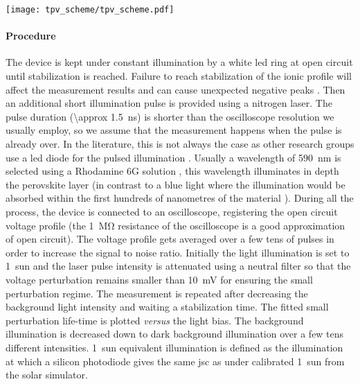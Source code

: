 \begin{SCfigure}
	\centering
	\texttt{[image: tpv\_scheme/tpv\_scheme.pdf]}
	\label{fig:tpv_scheme}
\end{SCfigure}

	\paragraph{Procedure}
	The device is kept under constant illumination by a white \gls{led} ring at open circuit until stabilization is reached.
	Failure to reach stabilization of the ionic profile will affect the measurement results \cite{ORegan2015b} and can cause unexpected negative  peaks \cite{Calado2016}.
	Then an additional short illumination pulse is provided using a nitrogen laser.
	The pulse duration (\SI{\approx 1.5}{\ns}) is shorter than the oscilloscope resolution we usually employ, so we assume that the measurement happens when the pulse is already over.
	In the literature, this is not always the case as other research groups use a \gls{led} diode for the pulsed illumination \cite{Calado2016}.
	Usually a wavelength of \SI{590}{\nm} is selected using a Rhodamine 6G solution \cite{RadiantDyesLaser}, this wavelength illuminates in depth the perovskite layer (in contrast to a blue light where the illumination would be absorbed within the first hundreds of nanometres of the material \cite{Bi2016,Tress2016}).
	During all the process, the device is connected to an oscilloscope, registering the open circuit voltage profile (the \SI{1}{\Mohm} resistance of the oscilloscope is a good approximation of open circuit).
	The voltage profile gets averaged over a few tens of pulses in order to increase the signal to noise ratio.
	Initially the light illumination is set to \SI{1}{sun} and the laser pulse intensity is attenuated using a neutral filter so that the voltage perturbation remains smaller than \SI{10}{\mV} for ensuring the small perturbation regime.
	The measurement is repeated after decreasing the background light intensity and waiting a stabilization time.
	The fitted small perturbation life\hyp{}time is plotted \textsl{versus} the light bias.
	The background illumination is decreased down to dark background illumination over a few tens different intensities.
	1~sun equivalent illumination is defined as the illumination at which a silicon photodiode gives the same \gls{jsc} as under calibrated 1~sun from the solar simulator.

